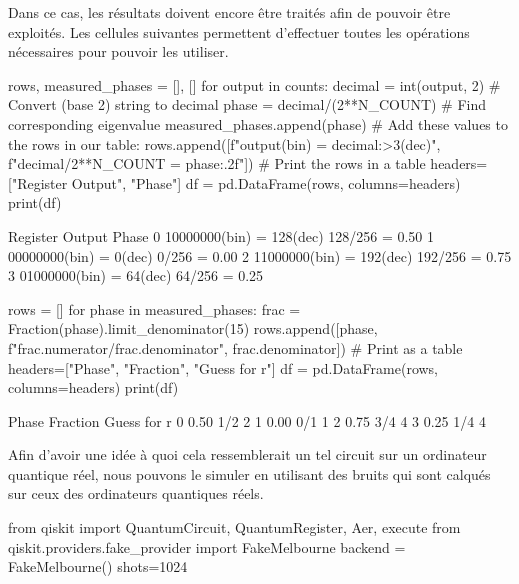 Dans ce cas, les résultats doivent encore être traités afin de pouvoir être exploités.
Les cellules suivantes permettent d'effectuer toutes les opérations nécessaires pour
pouvoir les utiliser.\\

\begin{pyin}
rows, measured_phases = [], []
for output in counts:
    decimal = int(output, 2)  # Convert (base 2) string to decimal
    phase = decimal/(2**N_COUNT)  # Find corresponding eigenvalue
    measured_phases.append(phase)
    # Add these values to the rows in our table:
    rows.append([f"{output}(bin) = {decimal:>3}(dec)",
                 f"{decimal}/{2**N_COUNT} = {phase:.2f}"])
# Print the rows in a table
headers=["Register Output", "Phase"]
df = pd.DataFrame(rows, columns=headers)
print(df)
\end{pyin}

\begin{pyprint}
            Register Output           Phase
0  10000000(bin) = 128(dec)  128/256 = 0.50
1  00000000(bin) =   0(dec)    0/256 = 0.00
2  11000000(bin) = 192(dec)  192/256 = 0.75
3  01000000(bin) =  64(dec)   64/256 = 0.25
\end{pyprint}

\begin{pyin}
rows = []
for phase in measured_phases:
    frac = Fraction(phase).limit_denominator(15)
    rows.append([phase,
                 f"{frac.numerator}/{frac.denominator}",
                 frac.denominator])
# Print as a table
headers=["Phase", "Fraction", "Guess for r"]
df = pd.DataFrame(rows, columns=headers)
print(df)
\end{pyin}

\begin{pyprint}
   Phase Fraction  Guess for r
0   0.50      1/2            2
1   0.00      0/1            1
2   0.75      3/4            4
3   0.25      1/4            4
\end{pyprint}

Afin d'avoir une idée à quoi cela ressemblerait un tel circuit sur un ordinateur quantique réel,
nous pouvons le simuler en utilisant des bruits qui sont calqués sur ceux des ordinateurs quantiques
réels.\\

\begin{pyin}
from qiskit import QuantumCircuit, QuantumRegister, Aer, execute
from qiskit.providers.fake_provider import FakeMelbourne
backend = FakeMelbourne()
shots=1024
\end{pyin}

